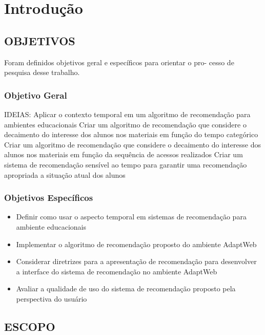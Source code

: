 \chapter{Introdução}\label{introducao}

\section{\uppercase{Objetivos}}

Foram definidos objetivos geral e específicos para orientar o pro- cesso de pesquisa desse trabalho.

\subsection{Objetivo Geral}

IDEIAS:
Aplicar o contexto temporal em um algoritmo de recomendação para ambientes educacionais
Criar um algoritmo de recomendação que considere o decaimento do interesse dos alunos nos materiais em função do
tempo categórico
Criar um algoritmo de recomendação que considere o decaimento do interesse dos alunos nos materiais em função da
sequência de acessos realizados
Criar um sistema de recomendação sensível ao tempo para garantir uma recomendação apropriada a situação atual dos alunos



\subsection{Objetivos Específicos}

\begin{itemize}
\item Definir como usar o aspecto temporal em sistemas de recomendação para ambiente educacionais
\item Implementar o algoritmo de recomendação proposto do ambiente AdaptWeb
\item Considerar diretrizes para a apresentação de recomendação para desenvolver a interface do sistema de recomendação
no ambiente AdaptWeb
\item Avaliar a qualidade de uso do sistema de recomendação proposto pela perspectiva do usuário
\end{itemize}

\section{\uppercase{Escopo}}

